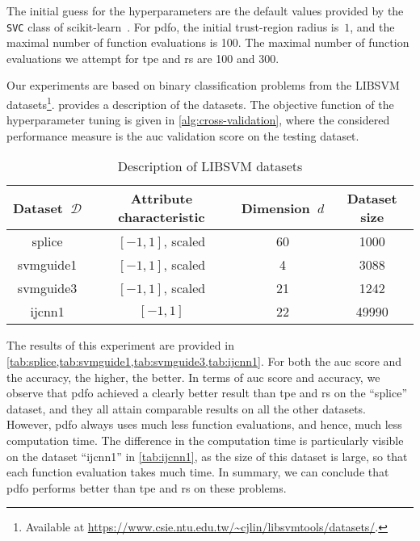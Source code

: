 The initial guess for the hyperparameters are the default values provided by the \texttt{SVC} class of scikit-learn~\cite{Pedregosa_Etal_2011}.
For \gls{pdfo}, the initial trust-region radius is~$1$, and the maximal number of function evaluations is \num{100}.
The maximal number of function evaluations we attempt for \gls{tpe} and \gls{rs} are \num{100} and \num{300}.

Our experiments are based on binary classification problems from the LIBSVM datasets\footnote{Available at \url{https://www.csie.ntu.edu.tw/~cjlin/libsvmtools/datasets/}.}.
 provides a description of the datasets.
The objective function of the hyperparameter tuning is given in \cref{alg:cross-validation}, where the considered performance measure is the \gls{auc} validation score on the testing dataset.

\begin{table}[ht]
    \caption{Description of LIBSVM datasets}
    \label{tab:htdata}
    \centering
    \begin{tabular}{ccS[table-parse-only]S[table-parse-only]}
        \toprule
        Dataset~$\mathcal{D}$   & Attribute characteristic  & {Dimension~$d$}   & {Dataset size}\\
        \midrule
        splice                  & $[-1, 1]$, scaled         & 60                & 1000\\
        svmguide1               & $[-1, 1]$, scaled         & 4                 & 3088\\
        svmguide3               & $[-1, 1]$, scaled         & 21                & 1242\\
        ijcnn1                  & $[-1, 1]$                 & 22                & 49990\\
        \bottomrule
    \end{tabular}
\end{table}
%

The results of this experiment are provided in \cref{tab:splice,tab:svmguide1,tab:svmguide3,tab:ijcnn1}.
For both the \gls{auc} score and the accuracy, the higher, the better.
In terms of \gls{auc} score and accuracy, we observe that \gls{pdfo} achieved a clearly better result than \gls{tpe} and \gls{rs} on the \enquote{splice} dataset, and they all attain comparable results on all the other datasets.
However, \gls{pdfo} always uses much less function evaluations, and hence, much less computation time.
The difference in the computation time is particularly visible on the dataset \enquote{ijcnn1} in \cref{tab:ijcnn1}, as the size of this dataset is large, so that each function evaluation takes much time.
In summary, we can conclude that \gls{pdfo} performs better than \gls{tpe} and \gls{rs} on these problems.

